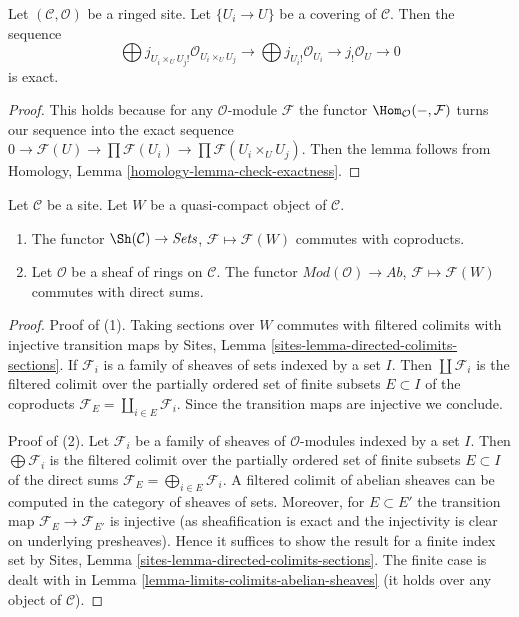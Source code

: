 \begin{lemma}
\label{lemma-covering-gives-surjection}
Let $(\mathcal{C}, \mathcal{O})$ be a ringed site. Let $\{U_i \to U\}$
be a covering of $\mathcal{C}$. Then the sequence
$$
\bigoplus j_{U_i \times_U U_j!}\mathcal{O}_{U_i \times_U U_j} \to
\bigoplus j_{U_i!}\mathcal{O}_{U_i} \to j_!\mathcal{O}_U \to 0
$$
is exact.
\end{lemma}

\begin{proof}
This holds because for any $\mathcal{O}$-module $\mathcal{F}$ the functor
$\Hom_\mathcal{O}(-, \mathcal{F})$ turns our sequence into the exact sequence
$0 \to \mathcal{F}(U) \to \prod \mathcal{F}(U_i) \to
\prod \mathcal{F}(U_i \times_U U_j)$. Then the lemma follows from
Homology, Lemma \ref{homology-lemma-check-exactness}.
\end{proof}

\begin{lemma}
\label{lemma-sections-over-quasi-compact}
Let $\mathcal{C}$ be a site. Let $W$ be a quasi-compact
object of $\mathcal{C}$.
\begin{enumerate}
\item The functor $\Sh(\mathcal{C}) \to \textit{Sets}$,
$\mathcal{F} \mapsto \mathcal{F}(W)$ commutes with coproducts.
\item Let $\mathcal{O}$ be a sheaf of rings on $\mathcal{C}$. The functor
$\textit{Mod}(\mathcal{O}) \to \textit{Ab}$,
$\mathcal{F} \mapsto \mathcal{F}(W)$
commutes with direct sums.
\end{enumerate}
\end{lemma}

\begin{proof}
Proof of (1). Taking sections over $W$ commutes with filtered colimits
with injective transition maps by
Sites, Lemma \ref{sites-lemma-directed-colimits-sections}.
If $\mathcal{F}_i$ is a family of sheaves of sets
indexed by a set $I$. Then $\coprod \mathcal{F}_i$ is the filtered
colimit over the partially ordered set of finite subsets
$E \subset I$ of the coproducts
$\mathcal{F}_E = \coprod_{i \in E} \mathcal{F}_i$.
Since the transition maps are injective we conclude.

\medskip\noindent
Proof of (2).
Let $\mathcal{F}_i$ be a family of sheaves of $\mathcal{O}$-modules
indexed by a set $I$. Then $\bigoplus \mathcal{F}_i$ is the filtered
colimit over the partially ordered set of finite subsets
$E \subset I$ of the direct sums
$\mathcal{F}_E = \bigoplus_{i \in E} \mathcal{F}_i$.
A filtered colimit of abelian sheaves can be computed in the
category of sheaves of sets. Moreover, for $E \subset E'$ the transition map
$\mathcal{F}_E \to \mathcal{F}_{E'}$ is injective (as sheafification
is exact and the injectivity is clear on underlying presheaves).
Hence it suffices to show the result for a finite index set by
Sites, Lemma \ref{sites-lemma-directed-colimits-sections}.
The finite case is dealt with in
Lemma \ref{lemma-limits-colimits-abelian-sheaves}
(it holds over any object of $\mathcal{C}$).
\end{proof}

